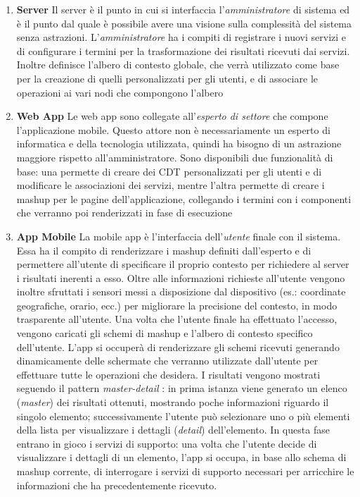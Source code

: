 \begin{enumerate}
	\item \textbf{Server} Il server è il punto in cui si interfaccia l'\emph{amministratore} di sistema ed è il punto dal quale è possibile avere una visione sulla complessità del sistema senza astrazioni. L'\emph{amministratore} ha i compiti di registrare i nuovi servizi e di configurare i termini per la trasformazione dei risultati ricevuti dai servizi. Inoltre definisce l'albero di contesto globale, che verrà utilizzato come base per la creazione di quelli personalizzati per gli utenti, e di associare le operazioni ai vari nodi che compongono l'albero
	
	\item \textbf{Web App} Le web app sono collegate all'\emph{esperto di settore} che compone l'applicazione mobile. Questo attore non è necessariamente un esperto di informatica e della tecnologia utilizzata, quindi ha bisogno di un astrazione maggiore rispetto all'amministratore. Sono disponibili due funzionalità di base: una permette di creare dei CDT personalizzati per gli utenti e di modificare le associazioni dei servizi, mentre l'altra permette di creare i mashup per le pagine dell'applicazione, collegando i termini con i componenti che verranno poi renderizzati in fase di esecuzione
	
	\item \textbf{App Mobile} La mobile app è l'interfaccia dell'\emph{utente} finale con il sistema. Essa ha il compito di renderizzare i mashup definiti dall'esperto e di permettere all'utente di specificare il proprio contesto per richiedere al server i risultati inerenti a esso. Oltre alle informazioni richieste all'utente vengono inoltre sfruttati i sensori messi a disposizione dal dispositivo (es.: coordinate geografiche, orario, ecc.) per migliorare la precisione del contesto, in modo trasparente all'utente.
	Una volta che l'utente finale ha effettuato l'accesso, vengono caricati gli schemi di mashup e l'albero di contesto specifico dell'utente. L'app si occuperà di renderizzare gli schemi ricevuti generando dinamicamente delle schermate che verranno utilizzate dall'utente per effettuare tutte le operazioni che desidera.
	I risultati vengono mostrati seguendo il pattern \emph{master-detail} \cite{molina2002user}: in prima istanza viene generato un elenco (\emph{master}) dei risultati ottenuti, mostrando poche informazioni riguardo il singolo elemento; successivamente l'utente può selezionare uno o più elementi della lista per visualizzare i dettagli (\emph{detail}) dell'elemento. In questa fase entrano in gioco i servizi di supporto: una volta che l'utente decide di visualizzare i dettagli di un elemento, l'app si occupa, in base allo schema di mashup corrente, di interrogare i servizi di supporto necessari per arricchire le informazioni che ha precedentemente ricevuto.
\end{enumerate}

